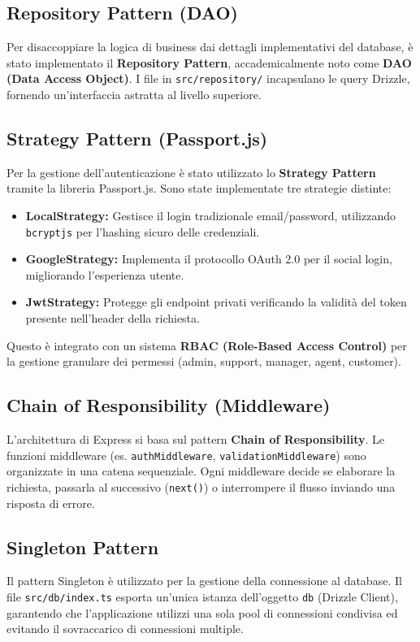 \subsection{Repository Pattern (DAO)}
Per disaccoppiare la logica di business dai dettagli implementativi del database, è stato implementato il \textbf{Repository Pattern}, accademicalmente noto come \textbf{DAO (Data Access Object)}. I file in \texttt{src/repository/} incapsulano le query Drizzle, fornendo un'interfaccia astratta al livello superiore.

\subsection{Strategy Pattern (Passport.js)}
Per la gestione dell'autenticazione è stato utilizzato lo \textbf{Strategy Pattern} tramite la libreria Passport.js. Sono state implementate tre strategie distinte:
\begin{itemize}
    \item \textbf{LocalStrategy:} Gestisce il login tradizionale email/password, utilizzando \texttt{bcryptjs} per l'hashing sicuro delle credenziali.
    \item \textbf{GoogleStrategy:} Implementa il protocollo OAuth 2.0 per il social login, migliorando l'esperienza utente.
    \item \textbf{JwtStrategy:} Protegge gli endpoint privati verificando la validità del token presente nell'header della richiesta.
\end{itemize}
Questo è integrato con un sistema \textbf{RBAC (Role-Based Access Control)} per la gestione granulare dei permessi (admin, support, manager, agent, customer).

\subsection{Chain of Responsibility (Middleware)}
L'architettura di Express si basa sul pattern \textbf{Chain of Responsibility}. Le funzioni 
middleware (es. \texttt{authMiddleware}, \texttt{validationMiddleware}) sono organizzate 
in una catena sequenziale. Ogni middleware decide se elaborare la richiesta, passarla al 
successivo (\texttt{next()}) o interrompere il flusso inviando una risposta di errore.

\subsection{Singleton Pattern}
Il pattern Singleton è utilizzato per la gestione della connessione al database. Il file \texttt{src/db/index.ts} esporta un'unica istanza dell'oggetto \texttt{db} (Drizzle Client), garantendo che l'applicazione utilizzi una sola pool di connessioni condivisa ed evitando il sovraccarico di connessioni multiple.

